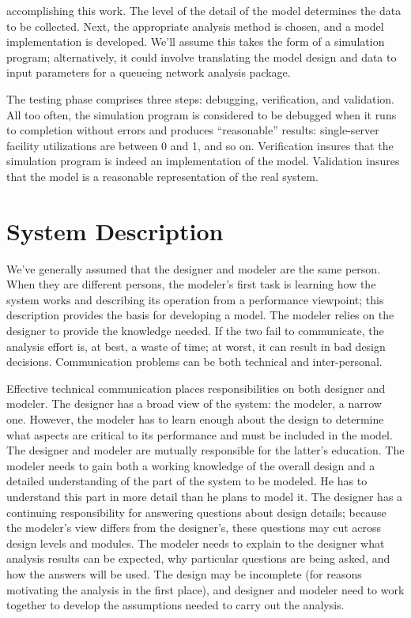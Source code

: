 \noindent accomplishing this work. The level of the detail of the model determines the
data to be collected. Next, the appropriate analysis method is chosen, and a
model implementation is developed. We'll assume this takes the form of a
simulation program; alternatively, it could involve translating the model
design and data to input parameters for a queueing network analysis package.

The testing phase comprises three steps: debugging, verification, and
validation. All too often, the simulation program is considered to be
debugged when it runs to completion without errors and produces
``reasonable'' results: single-server facility utilizations are between 0 and 1,
and so on. Verification insures that the simulation program is indeed an
implementation of the model. Validation insures that the model is a
reasonable representation of the real system.

\section{System Description}
\label{sec:system-description}

We've generally assumed that the designer and modeler are the same person.
When they are different persons, the modeler's first task is learning 
\noindent how the
system works and describing its operation from a performance viewpoint; this
description provides the basis for developing a model. The modeler relies on
the designer to provide the knowledge needed. If the two fail to communicate,
the analysis effort is, at best, a waste of time; at worst, it can result in bad
design decisions. Communication problems can be both technical and
inter-personal.

Effective technical communication places responsibilities on both designer and
modeler. The designer has a broad view of the system: the modeler, a narrow
one. However, the modeler has to learn enough about the design to determine
what aspects are critical to its performance and must be included in the
model. The designer and modeler are mutually responsible for the latter's
education. The modeler needs to gain both a working knowledge of the overall
design and a detailed understanding of the part of the system to be modeled.
He has to understand this part in more detail than he plans to model it. The
designer has a continuing responsibility for answering questions about design
details; because the modeler's view differs from the designer's, these
questions may cut across design levels and modules. The modeler needs to
explain to the designer what analysis results can be expected, why particular
questions are being asked, and how the answers will be used. The design may
be incomplete (for reasons motivating the analysis in the first place), and
designer and modeler need to work together to develop the assumptions needed
to carry out the analysis.

